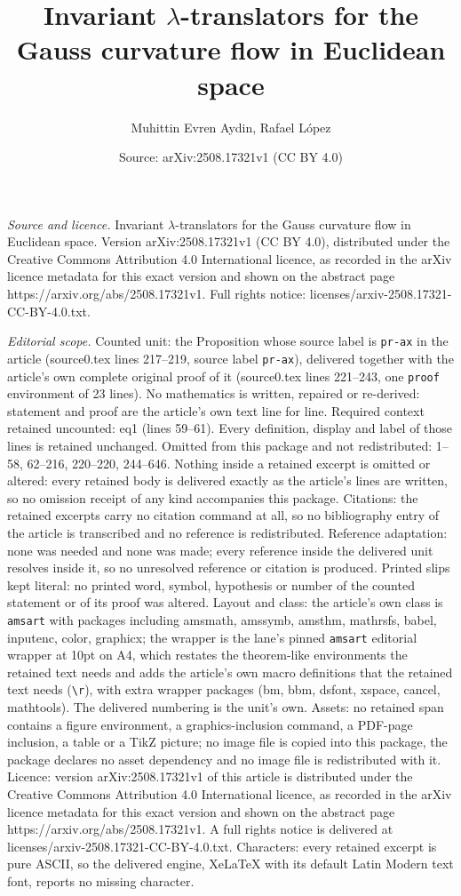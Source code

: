 \documentclass[10pt,a4paper]{amsart}
\title[Invariant $\lambda$-translators for the Gauss curvature flow]{Invariant $\lambda$-translators for the Gauss curvature flow in Euclidean space}
\author{Muhittin Evren Aydin, Rafael L\'opez}
\date{Source: arXiv:2508.17321v1 (CC BY 4.0)}
\begin{document}
\maketitle

\noindent\emph{Source and licence.} Invariant $\lambda$-translators for the Gauss curvature flow in Euclidean space. Version arXiv:2508.17321v1 (CC BY 4.0), distributed under the Creative Commons Attribution 4.0 International licence, as recorded in the arXiv licence metadata for this exact version and shown on the abstract page https://arxiv.org/abs/2508.17321v1. Full rights notice: licenses/arxiv-2508.17321-CC-BY-4.0.txt.\par\smallskip

\noindent\textit{Editorial scope.} Counted unit: the Proposition whose source label is \texttt{pr-ax} in the article (source0.tex lines 217--219, source label \texttt{pr-ax}), delivered together with the article's own complete original proof of it (source0.tex lines 221--243, one \texttt{proof} environment of 23 lines). No mathematics is written, repaired or re-derived: statement and proof are the article's own text line for line. Required context retained uncounted: eq1 (lines 59--61). Every definition, display and label of those lines is retained unchanged. Omitted from this package and not redistributed: 1--58, 62--216, 220--220, 244--646. Nothing inside a retained excerpt is omitted or altered: every retained body is delivered exactly as the article's lines are written, so no omission receipt of any kind accompanies this package. Citations: the retained excerpts carry no citation command at all, so no bibliography entry of the article is transcribed and no reference is redistributed. Reference adaptation: none was needed and none was made; every reference inside the delivered unit resolves inside it, so no unresolved reference or citation is produced. Printed slips kept literal: no printed word, symbol, hypothesis or number of the counted statement or of its proof was altered. Layout and class: the article's own class is \texttt{amsart} with packages including amsmath, amssymb, amsthm, mathrsfs, babel, inputenc, color, graphicx; the wrapper is the lane's pinned \texttt{amsart} editorial wrapper at 10pt on A4, which restates the theorem-like environments the retained text needs and adds the article's own macro definitions that the retained text needs (\texttt{\textbackslash r}), with extra wrapper packages (bm, bbm, dsfont, xspace, cancel, mathtools). The delivered numbering is the unit's own. Assets: no retained span contains a figure environment, a graphics-inclusion command, a PDF-page inclusion, a table or a TikZ picture; no image file is copied into this package, the package declares no asset dependency and no image file is redistributed with it. Licence: version arXiv:2508.17321v1 of this article is distributed under the Creative Commons Attribution 4.0 International licence, as recorded in the arXiv licence metadata for this exact version and shown on the abstract page https://arxiv.org/abs/2508.17321v1. A full rights notice is delivered at licenses/arxiv-2508.17321-CC-BY-4.0.txt. Characters: every retained excerpt is pure ASCII, so the delivered engine, XeLaTeX with its default Latin Modern text font, reports no missing character.
\end{document}
